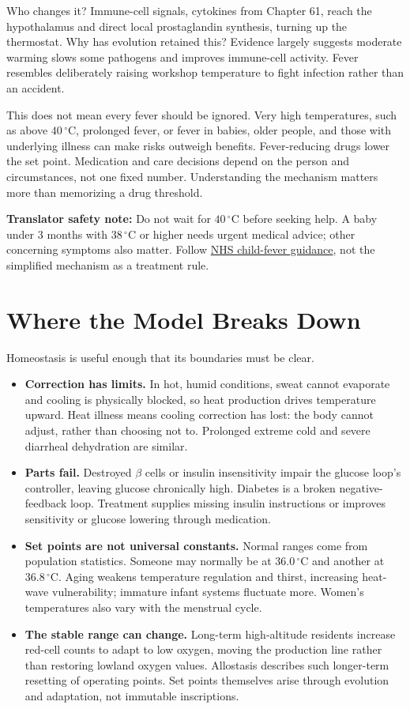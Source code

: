 Who changes it? Immune-cell signals, cytokines from Chapter 61, reach the hypothalamus and direct local prostaglandin synthesis, turning up the thermostat. Why has evolution retained this? Evidence largely suggests moderate warming slows some pathogens and improves immune-cell activity. Fever resembles deliberately raising workshop temperature to fight infection rather than an accident.

This does not mean every fever should be ignored. Very high temperatures, such as above $40\,^{\circ}\mathrm{C}$, prolonged fever, or fever in babies, older people, and those with underlying illness can make risks outweigh benefits. Fever-reducing drugs lower the set point. Medication and care decisions depend on the person and circumstances, not one fixed number. Understanding the mechanism matters more than memorizing a drug threshold.

\textbf{Translator safety note:} Do not wait for $40\,^{\circ}\mathrm{C}$ before seeking help. A baby under 3 months with $38\,^{\circ}\mathrm{C}$ or higher needs urgent medical advice; other concerning symptoms also matter. Follow \href{https://www.nhs.uk/symptoms/fever-in-children/}{NHS child-fever guidance}, not the simplified mechanism as a treatment rule.

\section{Where the Model Breaks Down}

Homeostasis is useful enough that its boundaries must be clear.

\begin{itemize}[itemsep=2pt]
\item \textbf{Correction has limits.} In hot, humid conditions, sweat cannot evaporate and cooling is physically blocked, so heat production drives temperature upward. Heat illness means cooling correction has lost: the body cannot adjust, rather than choosing not to. Prolonged extreme cold and severe diarrheal dehydration are similar.
\item \textbf{Parts fail.} Destroyed $\beta$ cells or insulin insensitivity impair the glucose loop's controller, leaving glucose chronically high. Diabetes is a broken negative-feedback loop. Treatment supplies missing insulin instructions or improves sensitivity or glucose lowering through medication.
\item \textbf{Set points are not universal constants.} Normal ranges come from population statistics. Someone may normally be at $36.0\,^{\circ}\mathrm{C}$ and another at $36.8\,^{\circ}\mathrm{C}$. Aging weakens temperature regulation and thirst, increasing heat-wave vulnerability; immature infant systems fluctuate more. Women's temperatures also vary with the menstrual cycle.
\item \textbf{The stable range can change.} Long-term high-altitude residents increase red-cell counts to adapt to low oxygen, moving the production line rather than restoring lowland oxygen values. Allostasis describes such longer-term resetting of operating points. Set points themselves arise through evolution and adaptation, not immutable inscriptions.
\end{itemize}

